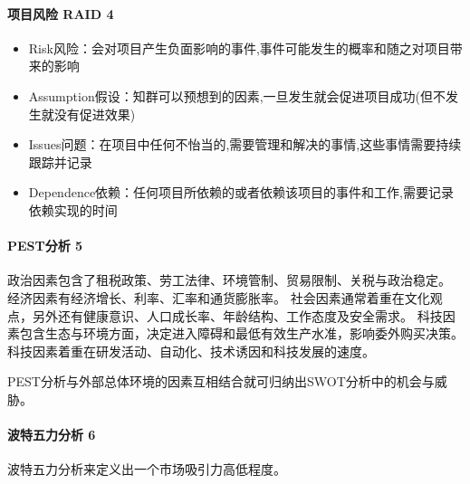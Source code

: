 \documentclass[letterpaper,11pt,english]{sphinxmanual}
\begin{document}
\paragraph{项目风险 RAID 4\sphinxfootnotemark[148]}
\label{\detokenize{chapter_skill/BRD:raid-4}}%
\begin{footnotetext}[148]\sphinxAtStartFootnote
{}
%
\end{footnotetext}\ignorespaces \begin{itemize}
\item {} 
Risk风险：会对项目产生负面影响的事件,事件可能发生的概率和随之对项目带来的影响

\item {} 
Assumption假设：知群可以预想到的因素,一旦发生就会促进项目成功(但不发生就没有促进效果)

\item {} 
Issues问题：在项目中任何不怡当的,需要管理和解决的事情,这些事情需要持续跟踪并记录

\item {} 
Dependence依赖：任何项目所依赖的或者依赖该项目的事件和工作,需要记录依赖实现的时间

\end{itemize}


\paragraph{PEST分析 5\sphinxfootnotemark[149]}
\label{\detokenize{chapter_skill/BRD:pest-5}}%
\begin{footnotetext}[149]\sphinxAtStartFootnote
{}
%
\end{footnotetext}\ignorespaces 
政治因素包含了租税政策、劳工法律、环境管制、贸易限制、关税与政治稳定。
经济因素有经济增长、利率、汇率和通货膨胀率。
社会因素通常着重在文化观点，另外还有健康意识、人口成长率、年龄结构、工作态度及安全需求。
科技因素包含生态与环境方面，决定进入障碍和最低有效生产水准，影响委外购买决策。科技因素着重在研发活动、自动化、技术诱因和科技发展的速度。

PEST分析与外部总体环境的因素互相结合就可归纳出SWOT分析中的机会与威胁。


\paragraph{波特五力分析 6\sphinxfootnotemark[150]}
\label{\detokenize{chapter_skill/BRD:id15}}%
\begin{footnotetext}[150]\sphinxAtStartFootnote
{}
%
\end{footnotetext}\ignorespaces 
波特五力分析来定义出一个市场吸引力高低程度。
\end{document}
